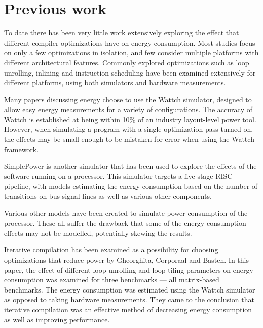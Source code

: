 \documentclass[twocolumn]{article}
\newcommand{\nsection}[1]{\section{\bfseries #1}}
\begin{document}
\nsection{Previous work}

To date there has been very little work extensively exploring the effect that different compiler optimizations have on energy consumption. Most studies focus on only a few optimizations in isolation, and few consider multiple platforms with different architectural features. Commonly explored optimizations such as loop unrolling, inlining and instruction scheduling have been examined extensively for different platforms, using both simulators and hardware measurements\cite{EffectOfCompilerOptimizationsOnPentium4}.

Many papers discussing energy choose to use the Wattch simulator\cite{Wattch}, designed to allow easy energy measurements for a variety of configurations. The accuracy of Wattch is established at being within 10\% of an industry layout-level power tool. However, when simulating a program with a single optimization pass turned on, the effects may be small enough to be mistaken for error when using the Wattch framework.

SimplePower\cite{SimplePower} is another simulator that has been used to explore the effects of the software running on a processor. This simulator targets a five stage RISC pipeline, with models estimating the energy consumption based on the number of transitions on bus signal lines as well as various other components.

Various other models have been created to simulate power consumption of the processor\cite{Park2011,Schneider2005}. These all suffer the drawback that some of the energy consumption effects may not be modelled, potentially skewing the results.

Iterative compilation has been examined as a possibility for choosing optimizations that reduce power by Gheorghita, Corporaal and Basten\cite{IterativeCompilationForEnergy}. In this paper, the effect of different loop unrolling and loop tiling parameters on energy consumption was examined for three benchmarks --- all matrix-based benchmarks. The energy consumption was estimated using the Wattch simulator as opposed to taking hardware measurements. They came to the conclusion that iterative compilation was an effective method of decreasing energy consumption as well as improving performance.
\end{document}

